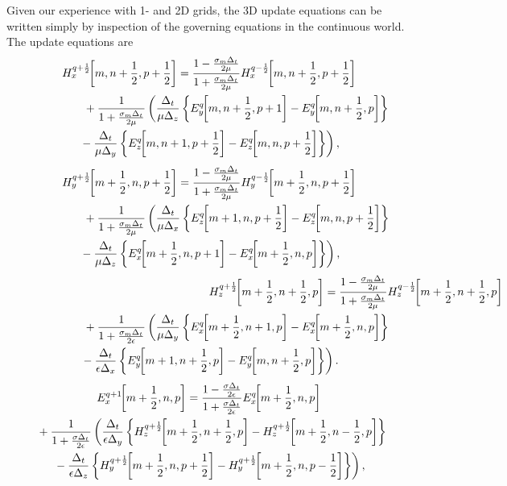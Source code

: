 Given our experience with 1- and 2D grids, the 3D update equations can
be written simply by inspection of the governing equations in the
continuous world.  The update equations are
\begin{multline}
   \fdtdh{H_x}{m,n+\half,p+\half}{q+\half} =
   \frac{1-\frac{\sigma_m\Delt}{2\mu}}{1+\frac{\sigma_m\Delt}{2\mu}}
   \fdtdh{H_x}{m,n+\half,p+\half}{q-\half} \\
   \hspace{.68in}\mbox{} +
   \frac{1}{1+\frac{\sigma_m\Delt}{2\mu}}\left(
    \frac{\Delt}{\mu\Delz}
       \left\{\fdtdh{E_y}{m,n+\half,p+1}{q}-
             \fdtdh{E_y}{m,n+\half,p}{q}\right\}\right. \\
    \left.\mbox{} -
    \frac{\Delt}{\mu\Dely}
       \left\{\fdtdh{E_z}{m,n+1,p+\half}{q}-
             \fdtdh{E_z}{m,n,p+\half}{q}\right\}\right),
\end{multline}
\begin{multline}
  \fdtdh{H_y}{m+\half,n,p+\half}{q+\half} =
  \frac{1-\frac{\sigma_m\Delt}{2\mu}}{1+\frac{\sigma_m\Delt}{2\mu}}
  \fdtdh{H_y}{m+\half,n,p+\half}{q-\half} \\
  \hspace{.68in}\mbox{} + 
  \frac{1}{1+\frac{\sigma_m\Delt}{2\mu}}\left(
   \frac{\Delt}{\mu\Delx}
      \left\{\fdtdh{E_z}{m+1,n,p+\half}{q}-
             \fdtdh{E_z}{m,n,p+\half}{q}\right\}\right.\\
   \left.\mbox{} -
   \frac{\Delt}{\mu\Delz}
      \left\{\fdtdh{E_x}{m+\half,n,p+1}{q}-
             \fdtdh{E_x}{m+\half,n,p}{q}\right\}\right),
\end{multline}
\begin{multline}
  \lefteqn{\fdtdh{H_z}{m+\half,n+\half,p}{q+\half} =
  \frac{1-\frac{\sigma_m\Delt}{2\mu}}{1+\frac{\sigma_m\Delt}{2\mu}}
  \fdtdh{H_z}{m+\half,n+\half,p}{q-\half}}
  \\
  \hspace{.68in}\mbox{} +
  \frac{1}{1+\frac{\sigma_m\Delt}{2\epsilon}}
  \left(
    \frac{\Delt}{\mu\Dely}
    \left\{
      \fdtdh{E_x}{m+\half,n+1,p}{q} - \fdtdh{E_x}{m+\half,n,p}{q}
    \right\} \right.\\
   \left.\mbox{}-
    \frac{\Delt}{\epsilon\Delx}
    \left\{
      \fdtdh{E_y}{m+1,n+\half,p}{q} - \fdtdh{E_y}{m,n+\half,p}{q}
    \right\}
  \right).
\end{multline}
\begin{multline}
  \fdtdh{E_x}{m+\half,n,p}{q+1} =
   \frac{1-\frac{\sigma\Delt}{2\epsilon}}{1+\frac{\sigma\Delt}{2\epsilon}}
   \fdtdh{E_x}{m+\half,n,p}{q} \\
   \hspace{.08in}\mbox{} +
   \frac{1}{1+\frac{\sigma\Delt}{2\epsilon}}
    \left(
    \frac{\Delt}{\epsilon\Dely}
    \left\{\fdtdh{H_z}{m+\half,n+\half,p}{q+\half}-
           \fdtdh{H_z}{m+\half,n-\half,p}{q+\half}\right\}\right.
   \\
    \left. \mbox{} -
    \frac{\Delt}{\epsilon\Delz}
    \left\{\fdtdh{H_y}{m+\half,n,p+\half}{q+\half}-
           \fdtdh{H_y}{m+\half,n,p-\half}{q+\half}\right\}\right),
\label{eq:exThreeDUpdate}
\end{multline}
